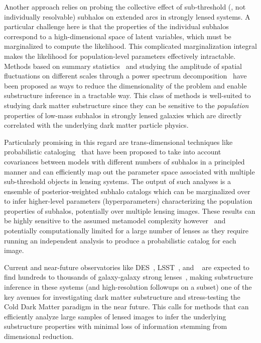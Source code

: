 \documentclass[twocolumn]{aastex63}
\begin{document}
Another approach relies on probing the collective effect of sub-threshold (\ie, not individually resolvable) subhalos on extended arcs in strongly lensed systems. A particular challenge here is that the  properties of the individual subhalos correspond to a high-dimensional space of latent variables, which must be marginalized to compute the likelihood. This complicated marginalization integral makes the likelihood for population-level parameters effectively intractable. Methods based on summary statistics~\citep{1702.00009} and studying the amplitude of spatial fluctuations on different scales through a power spectrum decomposition~\citep{1403.2720,1506.01724,1707.04590,1710.03075,1809.00004,1806.07897,1808.03501} have been proposed as ways to reduce the dimensionality of the problem and enable substructure inference in a tractable way. This class of methods is well-suited to studying dark matter substructure since they can be sensitive to the \emph{population} properties of low-mass subhalos in strongly lensed galaxies which are directly correlated with the underlying dark matter particle physics.

Particularly promising in this regard are trans-dimensional techniques like probabilistic cataloging~\citep{1508.00662,1706.06111} that have been proposed to take into account covariances between models with different numbers of subhalos in a principled manner and can efficiently map out the parameter space associated with multiple sub-threshold objects in lensing systems. The output of such analyses is a ensemble of posterior-weighted subhalo catalogs which can be marginalized over to infer higher-level parameters (hyperparameters) characterizing the population properties of subhalos, potentially over multiple lensing images. These results can be highly sensitive to the assumed metamodel complexity however~\citep{1706.06111} and potentially computationally limited for a large number of lenses as they require running an independent analysis to produce a probabilistic catalog for each image.

Current and near-future observatories like DES~\citep{1601.00329}, LSST~\citep{0912.0201,2019arXiv190201055D,1902.05141}, and \Euclid~\citep{1001.0061} are expected to find hundreds to thousands of galaxy-galaxy strong lenses~\citep{1001.2037,1003.5567,2015ApJ...811...20C}, making substructure inference in these systems (and high-resolution followups on a subset) one of the key avenues for investigating dark matter substructure and stress-testing the Cold Dark Matter paradigm in the near future. This calls for methods that can efficiently analyze large samples of lensed images to infer the underlying substructure properties with minimal loss of information stemming from dimensional reduction.
\end{document}
